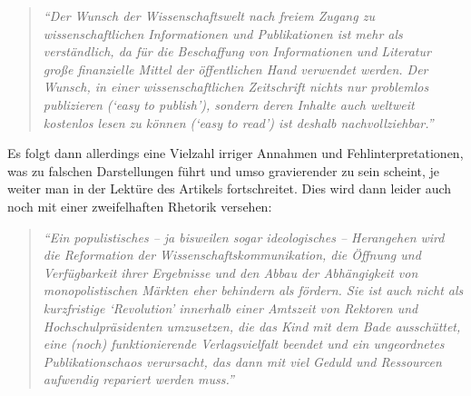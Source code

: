 \documentclass[a4paper,
fontsize=11pt,
oneside,
numbers=noperiodatend,
parskip=half-,
bibliography=totoc,
final
]{scrartcl}
\begin{document}
\begin{quote}
\emph{\enquote{Der Wunsch der Wissenschaftswelt nach freiem Zugang zu
wissenschaftlichen Informationen und Publikationen ist mehr als
verständlich, da für die Beschaffung von Informationen und Literatur
große finanzielle Mittel der öffentlichen Hand verwendet werden. Der
Wunsch, in einer wissenschaftlichen Zeitschrift nichts nur problemlos
publizieren (\enquote{easy to publish}), sondern deren Inhalte auch
weltweit kostenlos lesen zu können (\enquote{easy to read}) ist deshalb
nachvollziehbar.}}
\end{quote}

Es folgt dann allerdings eine Vielzahl irriger Annahmen und
Fehlinterpretationen, was zu falschen Darstellungen führt und umso
gravierender zu sein scheint, je weiter man in der Lektüre des Artikels
fortschreitet. Dies wird dann leider auch noch mit einer zweifelhaften
Rhetorik versehen:

\begin{quote}
\emph{\enquote{Ein populistisches -- ja bisweilen sogar ideologisches --
Herangehen wird die Reformation der Wissenschaftskommunikation, die
Öffnung und Verfügbarkeit ihrer Ergebnisse und den Abbau der
Abhängigkeit von monopolistischen Märkten eher behindern als fördern.
Sie ist auch nicht als kurzfristige \enquote{Revolution} innerhalb einer
Amtszeit von Rektoren und Hochschulpräsidenten umzusetzen, die das Kind
mit dem Bade ausschüttet, eine (noch) funktionierende Verlagsvielfalt
beendet und ein ungeordnetes Publikationschaos verursacht, das dann mit
viel Geduld und Ressourcen aufwendig repariert werden muss.}}
\end{quote}
\end{document}
